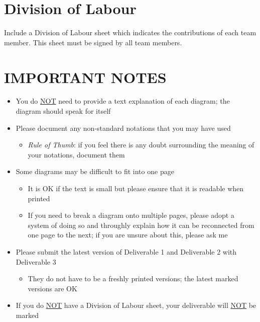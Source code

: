 \documentclass[]{article}
\begin{document}
\appendix
\section{Division of Labour}
\label{sec:division_of_labour}
Include a Division of Labour sheet which indicates the contributions of each team member. This sheet must be signed by all team members.

\newpage
\section*{IMPORTANT NOTES}
\begin{itemize}
	\item You do \underline{NOT} need to provide a text explanation of each diagram; the diagram should speak for itself
	\item Please document any non-standard notations that you may have used
	\begin{itemize}
		\item \emph{Rule of Thumb}: if you feel there is any doubt surrounding the meaning of your notations, document them
	\end{itemize}
	\item Some diagrams may be difficult to fit into one page
	\begin{itemize}
		\item It is OK if the text is small but please ensure that it is readable when printed
		\item If you need to break a diagram onto multiple pages, please adopt a system of doing so and throughly explain how it can be reconnected from one page to the next; if you are unsure about this, please ask me
	\end{itemize}
	\item Please submit the latest version of Deliverable 1 and Deliverable 2 with Deliverable 3
	\begin{itemize}
		\item They do not have to be a freshly printed versions; the latest marked versions are OK
	\end{itemize}
	\item If you do \underline{NOT} have a Division of Labour sheet, your deliverable will \underline{NOT} be marked
\end{itemize}
\end{document}
